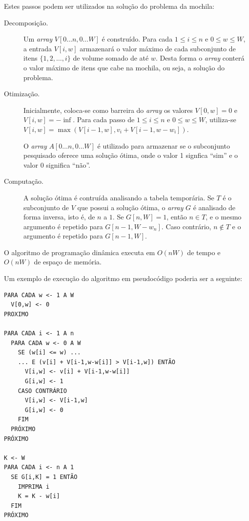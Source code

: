 \documentclass[a4paper,twocolumn]{article}
\begin{document}
Estes passos podem ser utilizados na solução do problema da mochila:

\begin{description}

\item[Decomposição.] Um {\em array} $V[0\ldots n, 0\ldots W]$ é construído. Para cada $1\leq i\leq n$ e $0\leq w\leq W$, a entrada $V[i,w]$ armazenará o valor máximo de cada subconjunto de itens $\{1,2,\ldots,i\}$ de volume somado de até $w$. Desta forma o {\em array} conterá o valor máximo de itens que cabe na mochila, ou seja, a solução do problema.

\item[Otimização.] Inicialmente, coloca-se como barreira do {\em array} os valores $V[0,w]=0$ e $V[i,w]=-\inf$. Para cada passo de $1\leq i\leq n$ e $0\leq w\leq W$, utiliza-se $V[i,w] = \max(V[i-1,w], v_i + V[i-1,w-w_i])$.

O {\em array} $A[0\ldots n,0\ldots W]$ é utilizado para armazenar se o subconjunto pesquisado oferece uma solução ótima, onde o valor 1 signfica ``sim'' e o valor 0 significa ``não''.

\item[Computação.] A solução ótima é contruída analisando a tabela temporária. Se $T$ é o subconjunto de $V$ que possui a solução ótima, o {\em array} $G$ é analisado de forma inversa, isto é, de $n$ a $1$. Se $G[n,W] = 1$, então $n \in T$, e o mesmo argumento é repetido para $G[n-1,W-w_n]$. Caso contrário, $n \notin T$ e o argumento é repetido para $G[n-1,W]$.

\end{description}

O algoritmo de programação dinâmica executa em $O(nW)$ de tempo e $O(nW)$ de espaço de memória.

Um exemplo de execução do algoritmo em pseudocódigo poderia ser a seguinte:

\begin{samepage}
\begin{verbatim}
PARA CADA w <- 1 A W
  V[0,w] <- 0
PROXIMO

PARA CADA i <- 1 A n
  PARA CADA w <- 0 A W
    SE (w[i] <= w) ...
    ... E (v[i] + V[i-1,w-w[i]] > V[i-1,w]) ENTÃO
      V[i,w] <- v[i] + V[i-1,w-w[i]]
      G[i,w] <- 1
    CASO CONTRÁRIO
      V[i,w] <- V[i-1,w]
      G[i,w] <- 0
    FIM
  PRÓXIMO
PRÓXIMO

K <- W
PARA CADA i <- n A 1
  SE G[i,K] = 1 ENTÃO
    IMPRIMA i
    K = K - w[i]
  FIM
PRÓXIMO
\end{verbatim}
\end{samepage}
\end{document}
